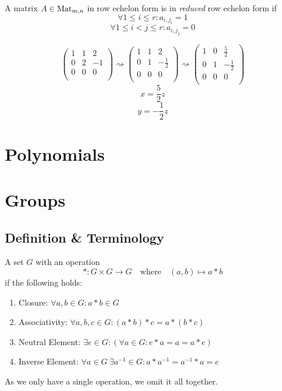 \begin{definition}
   A matrix \(A \in \operatorname{Mat}_{m,n}\) in row echelon form is in \textit{reduced} row echelon form if
   \[\forall 1 \leq i \leq r: a_{i, j_i} = 1\]
   \[\forall 1 \leq i < j \leq r: a_{i, j_j} = 0\]
\end{definition}
\begin{example}
   \[\begin{pmatrix}
         1 & 1 &  2 \\
         0 & 2 & -1 \\
         0 & 0 & 0 \\
      \end{pmatrix} \rightsquigarrow \begin{pmatrix}
         1 & 1 &  2 \\
         0 & 1 & -\frac{1}{2} \\
         0 & 0 & 0 \\
      \end{pmatrix} \rightsquigarrow \begin{pmatrix}
         1 & 0 &  \frac{5}{2} \\
         0 & 1 & -\frac{1}{2} \\
         0 & 0 & 0 \\
      \end{pmatrix}
   \]
   \[x = \frac{5}{2}z\]
   \[y = -\frac{1}{2}z\]
\end{example}

\newpage

\section{Polynomials}

\newpage

\section{Groups}
\subsection{Definition \& Terminology}
\begin{definition}[Group]
   A set \(G\) with an operation
   \[\ast: G \times G \to G \quad\text{where}\quad (a, b) \mapsto a \ast b\]
   if the following holds:
   \begin{enumerate}[label=\roman*, align=Center]
      \item Closure: \(\forall a, b \in G: a \ast b \in G\)
      \item Associativity: \(\forall a, b, c \in G: (a \ast b) \ast c = a \ast (b \ast c)\)
      \item Neutral Element: \(\exists e \in G: (\forall a \in G: e \ast a = a = a \ast e)\)
      \item Inverse Element: \(\forall a \in G~\exists a^{-1} \in G: a \ast a^{-1} = a^{-1} \ast a = e\)
   \end{enumerate}
\end{definition}
\begin{remark}[Notation]
   As we only have a single operation, we omit it all together.
\end{remark}

